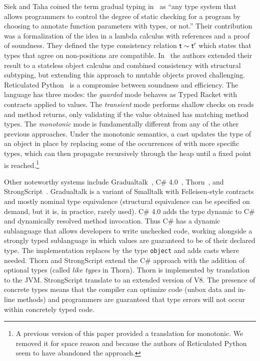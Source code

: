 \documentclass[a4paper,USenglish]{tex/lipics-v2016}
\begin{document}
Siek and Taha coined the term gradual typing in~\cite{SiekTaha06} as ``any
type system that allows programmers to control the degree of static checking
for a program by choosing to annotate function parameters with types, or
not.'' Their contribution was a formalization of the idea in a lambda
calculus with references and a proof of soundness. They defined the type
consistency relation $\t \sim \tp$ which states that types that agree on
non-\any positions are compatible.  In~\cite{SiekTaha07} the authors
extended their result to a stateless object calculus and combined
consistency with structural subtyping, but extending this approach to
mutable objects proved challenging.  Reticulated Python~\cite{siek14} is a
compromise between soundness and efficiency.  The language has three modes:
the \emph{guarded} mode behaves as Typed Racket with contracts applied to values.
The \emph{transient} mode performs shallow checks on reads and method returns, only
validating if the value obtained has matching method types.  The
\emph{monotonic} mode is fundamentally different from any of the other previous
approaches. Under the monotonic
semantics, a cast updates the type of an object in place by replacing some
of the occurrences of \any with more specific types, which can then
propagate recursively through the heap until a fixed point is
reached.\footnote{A previous version of this paper provided a translation
  for monotonic. We removed it for space reason and because the authors
  of Reticulated Python seem to have abandoned the approach.}

Other noteworthy systems include Gradualtalk~\cite{GS13}, C\#
4.0~\cite{Bierman10}, Thorn~\cite{oopsla09}, and
StrongScript~\cite{ecoop15}. Gradualtalk is a variant of Smalltalk with
Felleisen-style contracts and mostly nominal type equivalence (structural
equivalence can be specified on demand, but it is, in practice, rarely
used). C\# 4.0 adds the type {\sf dynamic} to C\# and dynamically resolved
method invocation. Thus C\# has a dynamic sublanguage that allows
developers to write unchecked code, working alongside a strongly typed
sublanguage in which values are guaranteed to be of their declared type.
The implementation replaces \any by the type {\tt object} and adds casts
where needed.  Thorn and StrongScript extend the C\# approach with the
addition of optional types (called {\em like types} in Thorn).  Thorn is
implemented by translation to the JVM. StrongScript translate to an extended
version of V8. The presence of concrete types means that the compiler can
optimize code (unbox data and in-line methods) and programmers are
guaranteed that type errors will not occur within concretely typed code.
\end{document}
